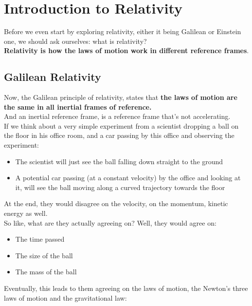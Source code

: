 \section{Introduction to Relativity}

Before we even start by exploring relativity, either it being Galilean or Einstein one, we should ask ourselves: what is relativity?\\

\textbf{Relativity is how the laws of motion work in different reference frames}.

\subsection{Galilean Relativity}
Now, the Galilean principle of relativity, states that \textbf{the laws of motion are the same in all inertial frames of reference.}\\

And an inertial reference frame, is a reference frame that's not accelerating.\\

If we think about a very simple experiment from a scientist dropping a ball on the floor in his office room, and a car passing by this office and observing the experiment:

\begin{itemize}
    \item The scientist will just see the ball falling down straight to the ground
    \item A potential car passing (at a constant velocity) by the office and looking at it, will see the ball moving along a curved trajectory towards the floor
\end{itemize}

At the end, they would disagree on the velocity, on the momentum, kinetic energy as well.\\
So like, what are they actually agreeing on? Well, they would agree on:

\begin{itemize}
    \item The time passed
    \item The size of the ball
    \item The mass of the ball
\end{itemize}

Eventually, this leads to them agreeing on the laws of motion, the Newton's three laws of motion and the gravitational law:

